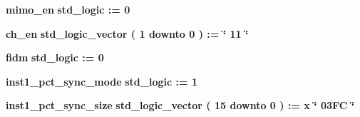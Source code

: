 \begin{DoxyCompactItemize}
\item 
{\bf mimo\+\_\+en} {\bfseries \textcolor{comment}{std\+\_\+logic}\textcolor{vhdlchar}{ }\textcolor{vhdlchar}{ }\textcolor{vhdlchar}{\+:}\textcolor{vhdlchar}{=}\textcolor{vhdlchar}{ }\textcolor{vhdlchar}{ }\textcolor{vhdlchar}{\textquotesingle{}}\textcolor{vhdlchar}{ } \textcolor{vhdldigit}{0} \textcolor{vhdlchar}{ }\textcolor{vhdlchar}{\textquotesingle{}}\textcolor{vhdlchar}{ }} 
\item 
{\bf ch\+\_\+en} {\bfseries \textcolor{comment}{std\+\_\+logic\+\_\+vector}\textcolor{vhdlchar}{ }\textcolor{vhdlchar}{(}\textcolor{vhdlchar}{ }\textcolor{vhdlchar}{ } \textcolor{vhdldigit}{1} \textcolor{vhdlchar}{ }\textcolor{keywordflow}{downto}\textcolor{vhdlchar}{ }\textcolor{vhdlchar}{ } \textcolor{vhdldigit}{0} \textcolor{vhdlchar}{ }\textcolor{vhdlchar}{)}\textcolor{vhdlchar}{ }\textcolor{vhdlchar}{ }\textcolor{vhdlchar}{ }\textcolor{vhdlchar}{\+:}\textcolor{vhdlchar}{=}\textcolor{vhdlchar}{ }\textcolor{vhdlchar}{ }\textcolor{vhdlchar}{ }\textcolor{vhdlchar}{ }\textcolor{keyword}{\char`\"{} 11 \char`\"{}}\textcolor{vhdlchar}{ }} 
\item 
{\bf fidm} {\bfseries \textcolor{comment}{std\+\_\+logic}\textcolor{vhdlchar}{ }\textcolor{vhdlchar}{ }\textcolor{vhdlchar}{\+:}\textcolor{vhdlchar}{=}\textcolor{vhdlchar}{ }\textcolor{vhdlchar}{ }\textcolor{vhdlchar}{\textquotesingle{}}\textcolor{vhdlchar}{ } \textcolor{vhdldigit}{0} \textcolor{vhdlchar}{ }\textcolor{vhdlchar}{\textquotesingle{}}\textcolor{vhdlchar}{ }} 
\item 
{\bf inst1\+\_\+pct\+\_\+sync\+\_\+mode} {\bfseries \textcolor{comment}{std\+\_\+logic}\textcolor{vhdlchar}{ }\textcolor{vhdlchar}{ }\textcolor{vhdlchar}{\+:}\textcolor{vhdlchar}{=}\textcolor{vhdlchar}{ }\textcolor{vhdlchar}{ }\textcolor{vhdlchar}{\textquotesingle{}}\textcolor{vhdlchar}{ } \textcolor{vhdldigit}{1} \textcolor{vhdlchar}{ }\textcolor{vhdlchar}{\textquotesingle{}}\textcolor{vhdlchar}{ }} 
\item 
{\bf inst1\+\_\+pct\+\_\+sync\+\_\+size} {\bfseries \textcolor{comment}{std\+\_\+logic\+\_\+vector}\textcolor{vhdlchar}{ }\textcolor{vhdlchar}{(}\textcolor{vhdlchar}{ }\textcolor{vhdlchar}{ } \textcolor{vhdldigit}{15} \textcolor{vhdlchar}{ }\textcolor{keywordflow}{downto}\textcolor{vhdlchar}{ }\textcolor{vhdlchar}{ } \textcolor{vhdldigit}{0} \textcolor{vhdlchar}{ }\textcolor{vhdlchar}{)}\textcolor{vhdlchar}{ }\textcolor{vhdlchar}{ }\textcolor{vhdlchar}{ }\textcolor{vhdlchar}{\+:}\textcolor{vhdlchar}{=}\textcolor{vhdlchar}{ }\textcolor{vhdlchar}{ }\textcolor{vhdlchar}{x}\textcolor{vhdlchar}{ }\textcolor{keyword}{\char`\"{} 03\+F\+C \char`\"{}}\textcolor{vhdlchar}{ }} 

\end{DoxyCompactItemize}
